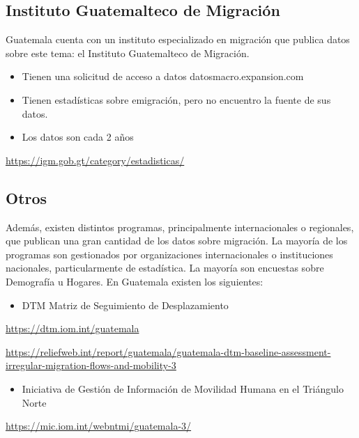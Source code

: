 \documentclass[
]{book}
\providecommand{\tightlist}{%
  \setlength{\itemsep}{0pt}\setlength{\parskip}{0pt}}
\begin{document}
\hypertarget{instituto-guatemalteco-de-migraciuxf3n}{%
\subsection{Instituto Guatemalteco de Migración}\label{instituto-guatemalteco-de-migraciuxf3n}}

Guatemala cuenta con un instituto especializado en migración que publica datos sobre este tema: el Instituto Guatemalteco de Migración.

\begin{itemize}
\tightlist
\item
  Tienen una solicitud de acceso a datos
  datosmacro.expansion.com
\item
  Tienen estadísticas sobre emigración, pero no encuentro la fuente de sus datos.
\item
  Los datos son cada 2 años
\end{itemize}

\url{https://igm.gob.gt/category/estadisticas/}

\hypertarget{otros-2}{%
\subsection{Otros}\label{otros-2}}

Además, existen distintos programas, principalmente internacionales o regionales, que publican una gran cantidad de los datos sobre migración. La mayoría de los programas son gestionados por organizaciones internacionales o instituciones nacionales, particularmente de estadística. La mayoría son encuestas sobre Demografía u Hogares. En Guatemala existen los siguientes:

\begin{itemize}
\tightlist
\item
  DTM Matriz de Seguimiento de Desplazamiento
\end{itemize}

\url{https://dtm.iom.int/guatemala}

\url{https://reliefweb.int/report/guatemala/guatemala-dtm-baseline-assessment-irregular-migration-flows-and-mobility-3}

\begin{itemize}
\tightlist
\item
  Iniciativa de Gestión de Información de Movilidad Humana en el Triángulo Norte
\end{itemize}

\url{https://mic.iom.int/webntmi/guatemala-3/}

  
\end{document}
